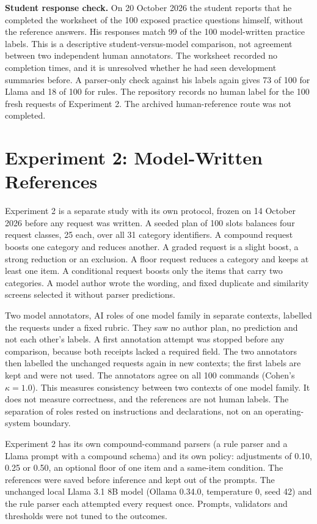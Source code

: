 \documentclass[conference]{IEEEtran}
\begin{document}
\textbf{Student response check.} On 20 October 2026 the student reports that he completed the worksheet of the 100 exposed practice questions himself, without the reference answers. His responses match 99 of the 100 model-written practice labels. This is a descriptive student-versus-model comparison, not agreement between two independent human annotators. The worksheet recorded no completion times, and it is unresolved whether he had seen development summaries before. A parser-only check against his labels again gives 73 of 100 for Llama and 18 of 100 for rules. The repository records no human label for the 100 fresh requests of Experiment 2. The archived human-reference route was not completed.

\section{Experiment 2: Model-Written References}
Experiment 2 is a separate study with its own protocol, frozen on 14 October 2026 before any request was written. A seeded plan of 100 slots balances four request classes, 25 each, over all 31 category identifiers. A compound request boosts one category and reduces another. A graded request is a slight boost, a strong reduction or an exclusion. A floor request reduces a category and keeps at least one item. A conditional request boosts only the items that carry two categories. A model author wrote the wording, and fixed duplicate and similarity screens selected it without parser predictions.

Two model annotators, AI roles of one model family in separate contexts, labelled the requests under a fixed rubric. They saw no author plan, no prediction and not each other's labels. A first annotation attempt was stopped before any comparison, because both receipts lacked a required field. The two annotators then labelled the unchanged requests again in new contexts; the first labels are kept and were not used. The annotators agree on all 100 commands (Cohen's $\kappa=1.0$). This measures consistency between two contexts of one model family. It does not measure correctness, and the references are not human labels. The separation of roles rested on instructions and declarations, not on an operating-system boundary.

Experiment 2 has its own compound-command parsers (a rule parser and a Llama prompt with a compound schema) and its own policy: adjustments of 0.10, 0.25 or 0.50, an optional floor of one item and a same-item condition. The references were saved before inference and kept out of the prompts. The unchanged local Llama 3.1 8B model (Ollama 0.34.0, temperature 0, seed 42) and the rule parser each attempted every request once. Prompts, validators and thresholds were not tuned to the outcomes.
\end{document}
